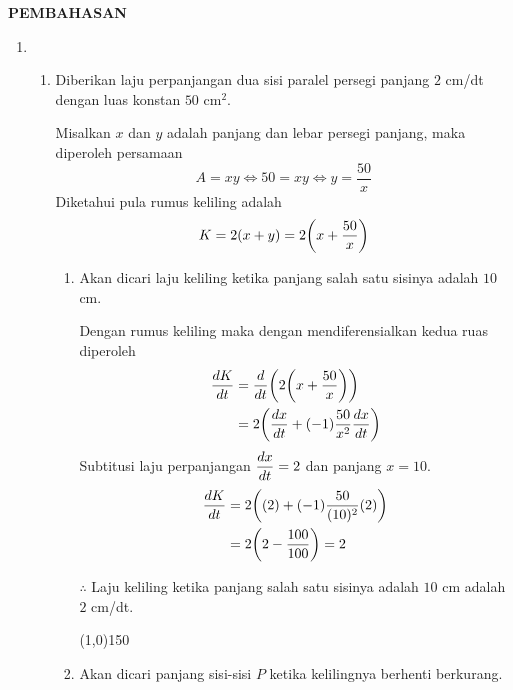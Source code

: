 \begin{center}
\textbf{\large{PEMBAHASAN}}
\end{center}
\begin{enumerate}[leftmargin=*, label={\arabic*}.]
\item
    \begin{enumerate}[label={\alph*}.]
    \item Diberikan laju perpanjangan dua sisi paralel persegi panjang $2$ cm/dt dengan 
    luas konstan $50$ cm$^{2}$.

    Misalkan $x$ dan $y$ adalah panjang dan lebar persegi panjang, maka diperoleh persamaan
    \[
    A = xy \iff 50 = xy \iff y = \frac{50}{x}
    \]
    Diketahui pula rumus keliling adalah
    \[
    K = 2(x+y) = 2\brk*{x+\frac{50}{x}}
    \]
        \begin{enumerate}[label={\roman*}.]
        \item Akan dicari laju keliling ketika panjang salah satu sisinya adalah $10$ cm.
        
        Dengan rumus keliling maka dengan mendiferensialkan kedua ruas diperoleh
        \begin{align*}
            \frac{dK}{dt} &= \drv{t}{2\brk*{x+\frac{50}{x}}}\\
            &=2\brk*{\frac{dx}{dt}+(-1)\frac{50}{x^{2}}\frac{dx}{dt}}\\
        \end{align*}
        Subtitusi laju perpanjangan $\displaystyle \frac{dx}{dt} = 2$ dan panjang $x=10$.
        \begin{align*}
            \frac{dK}{dt} &=2\brk*{(2)+(-1)\frac{50}{(10)^{2}}(2)}\\
            &=2\brk*{2-\frac{100}{100}} = 2
        \end{align*}

        $\therefore$ Laju keliling ketika panjang salah satu sisinya adalah $10$ cm adalah
        $2$ cm/dt.


\begin{center}\line(1,0){150}\end{center}

        
        \item Akan dicari panjang sisi-sisi $P$ ketika kelilingnya berhenti berkurang. 
        

\end{enumerate}
\end{enumerate}
\end{enumerate}
